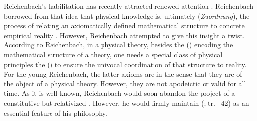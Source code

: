 \documentclass[draft]{article}
\newcommand{\WT}{Weyl's theory\xspace}
\newcommand{\rhp}[2]{(\cite[#1]{Reichenbach1920a}; tr.\ \citeyear{Reichenbach1969} #2)\xspace}
\begin{document}

Reichenbach's habilitation has recently attracted renewed attention \citep{Friedman2001}. Reichenbach borrowed from \citet{Schlick1918} that idea that physical knowledge is, ultimately (\emph{Zuordnung}), the process of relating an axiomatically defined mathematical structure to concrete empirical reality \citep{Padovani2009}. However, Reichenbach attempted to give this insight a  twist. According to Reichenbach, in a physical theory, besides the  () encoding the mathematical structure of a theory, one needs a special class of physical principles the  () to ensure the univocal coordination of that structure to reality. For the young Reichenbach, the latter axioms are \apr in the sense that they are  of the object of a physical theory. However, they are not apodeictic or valid for all time. As it is well known, Reichenbach would soon abandon the project of a constitutive but relativized \apr. However, he would firmly maintain  \rhp{40}{42} as an essential feature of his philosophy.







\end{document}
